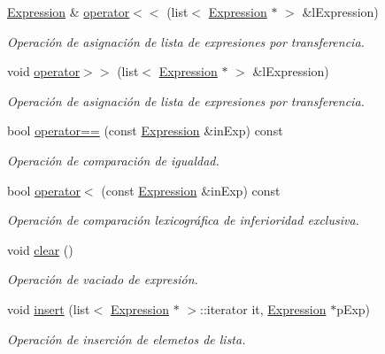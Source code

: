 \begin{DoxyCompactItemize}
\hyperlink{class_expression}{Expression} \& \hyperlink{class_expression_ae04ad8cf7596e8b69df67de53cff67e0}{operator$<$$<$} (list$<$ \hyperlink{class_expression}{Expression} $\ast$ $>$ \&l\+Expression)
\begin{DoxyCompactList}\small\item\em Operación de asignación de lista de expresiones por transferencia. \end{DoxyCompactList}\item 
void \hyperlink{class_expression_a21a202129abc628e19cebc38ad532dcc}{operator$>$$>$} (list$<$ \hyperlink{class_expression}{Expression} $\ast$ $>$ \&l\+Expression)
\begin{DoxyCompactList}\small\item\em Operación de asignación de lista de expresiones por transferencia. \end{DoxyCompactList}\item 
bool \hyperlink{class_expression_a8cd982884bef615b9c79526dce0956f6}{operator==} (const \hyperlink{class_expression}{Expression} \&in\+Exp) const 
\begin{DoxyCompactList}\small\item\em Operación de comparación de igualdad. \end{DoxyCompactList}\item 
bool \hyperlink{class_expression_a4f1f64418752d14e116f55b7b57355b8}{operator$<$} (const \hyperlink{class_expression}{Expression} \&in\+Exp) const 
\begin{DoxyCompactList}\small\item\em Operación de comparación lexicográfica de inferioridad exclusiva. \end{DoxyCompactList}\item 
void \hyperlink{class_expression_ab2e0ccb0146cccd559c39f8913f9585e}{clear} ()
\begin{DoxyCompactList}\small\item\em Operación de vaciado de expresión. \end{DoxyCompactList}\item 
void \hyperlink{class_expression_a2f087974bb5cee7d0ea06838f5d68ba8}{insert} (list$<$ \hyperlink{class_expression}{Expression} $\ast$ $>$\+::iterator it, \hyperlink{class_expression}{Expression} $\ast$p\+Exp)
\begin{DoxyCompactList}\small\item\em Operación de inserción de elemetos de lista. \end{DoxyCompactList}\item 

\end{DoxyCompactItemize}
